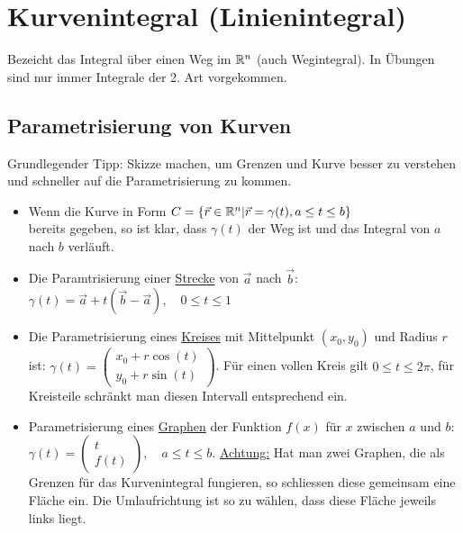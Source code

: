 \section{Kurvenintegral (Linienintegral)}
Bezeicht das Integral über einen Weg im $\mathbb{R}^n$ (auch Wegintegral). 
In Übungen sind nur immer Integrale der 2. Art vorgekommen. 

\subsection{Parametrisierung von Kurven}
Grundlegender Tipp: Skizze machen, um Grenzen und Kurve besser zu verstehen und
schneller auf die Parametrisierung zu kommen.

\begin{itemize}[leftmargin=*]
	\item Wenn die Kurve in Form
	$
	C = \{\vec{r} \in \mathbb{R}^n | \vec{r} = \gamma(t), a \leq t \leq b\}
	$\\
	bereits gegeben, so ist klar, dass $\gamma(t)$ der Weg ist und das Integral von
	$a$ nach $b$ verläuft.
	
	\item Die Paramtrisierung einer \underline{Strecke} von $\vec{a}$ nach $\vec{b}$:\\
	$\gamma(t) = \vec{a} + t(\vec{b}-\vec{a}), \quad 0 \leq t \leq 1$
	
	\item Die Parametrisierung eines \underline{Kreises} mit Mittelpunkt $(x_0, y_0)$ und
	Radius $r$ ist: $\gamma(t) =
	\begin{pmatrix}
	x_0 + r \cos(t)\\
	y_0 + r \sin(t)
	\end{pmatrix}$. Für einen vollen Kreis gilt $0 \leq t \leq 2\pi$, für Kreisteile
	schränkt man diesen Intervall entsprechend ein.
	
	\item Parametrisierung eines \underline{Graphen} der Funktion $f(x)$ für $x$
	zwischen $a$ und $b$: $\gamma(t) =
	\begin{pmatrix}
	t\\
	f(t)
	\end{pmatrix}, \quad a \leq t \leq b$. \underline{Achtung:} Hat man zwei
	Graphen, die als Grenzen für das Kurvenintegral fungieren, so schliessen diese
	gemeinsam eine Fläche ein. Die Umlaufrichtung ist so zu wählen, dass diese
	Fläche jeweils links liegt.
\end{itemize}


